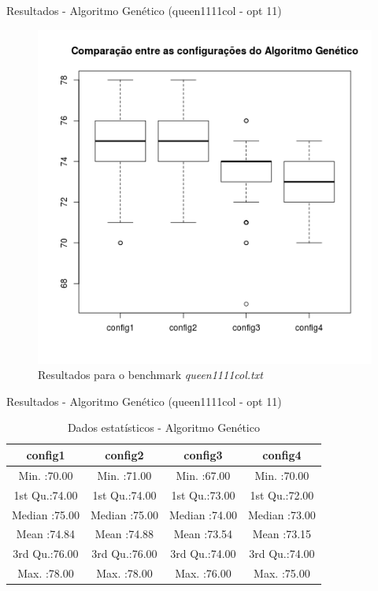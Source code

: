 \documentclass[compress, hide notes]{beamer}
\begin{document}
        \begin{frame}{Resultados - Algoritmo Genético (queen1111col - opt 11)}
        
        	\begin{figure}[H]
			\centering
            \label{fig:sol-ga-queen1111col}
            \includegraphics[width=0.5\linewidth]{img/ga-sol-queen1111col.png}
            \caption[Resultados para o benchmark queen1111col.txt]{Resultados para o benchmark \textit{queen1111col.txt}}
			\end{figure}

		\end{frame}
        
        \begin{frame}{Resultados - Algoritmo Genético (queen1111col - opt 11)}
        
        	\begin{table}[H]
            \centering
              \begin{tabular}{c|c|c|c}
               \textbf{config1}       &  \textbf{config2}               &  \textbf{config3}                &  \textbf{config4}                         \\ \hline \hline
               Min.   :70.00 &          Min.   :71.00 &           Min.   :67.00 &           Min.   :70.00          \\ \hline
               1st Qu.:74.00 &          1st Qu.:74.00 &           1st Qu.:73.00 &           1st Qu.:72.00          \\ \hline
               Median :75.00 &          Median :75.00 &           Median :74.00 &           Median :73.00          \\ \hline
               Mean   :74.84 &          Mean   :74.88 &           Mean   :73.54 &           Mean   :73.15          \\ \hline
               3rd Qu.:76.00 &          3rd Qu.:76.00 &           3rd Qu.:74.00 &           3rd Qu.:74.00          \\ \hline
               Max.   :78.00 &          Max.   :78.00 &           Max.   :76.00 &           Max.   :75.00          \\
              \end{tabular}
              \caption {Dados estatísticos - Algoritmo Genético}
        	\end{table}

		\end{frame}
        
\end{document}
